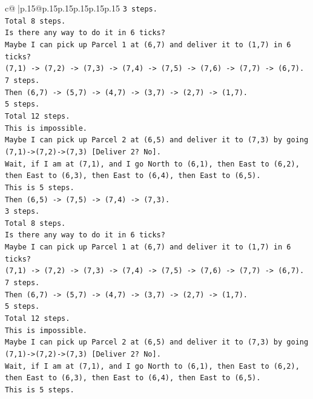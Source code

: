 \documentclass{article}
\begin{document}
{\begin{supertabular}{c@{$\;$}|p{.15\linewidth}@{}p{.15\linewidth}p{.15\linewidth}p{.15\linewidth}p{.15\linewidth}p{.15\linewidth}}
{{{\texttt{3 steps.} \\
\texttt{Total 8 steps.} \\
\texttt{Is there any way to do it in 6 ticks?} \\
\texttt{Maybe I can pick up Parcel 1 at (6,7) and deliver it to (1,7) in 6 ticks?} \\
\texttt{(7,1) {-}> (7,2) {-}> (7,3) {-}> (7,4) {-}> (7,5) {-}> (7,6) {-}> (7,7) {-}> (6,7).} \\
\texttt{7 steps.} \\
\texttt{Then (6,7) {-}> (5,7) {-}> (4,7) {-}> (3,7) {-}> (2,7) {-}> (1,7).} \\
\texttt{5 steps.} \\
\texttt{Total 12 steps.} \\
\texttt{This is impossible.} \\
\texttt{Maybe I can pick up Parcel 2 at (6,5) and deliver it to (7,3) by going (7,1){-}>(7,2){-}>(7,3) {[}Deliver 2? No{]}.} \\
\texttt{Wait, if I am at (7,1), and I go North to (6,1), then East to (6,2), then East to (6,3), then East to (6,4), then East to (6,5).} \\
\texttt{This is 5 steps.} \\
\texttt{Then (6,5) {-}> (7,5) {-}> (7,4) {-}> (7,3).} \\
\texttt{3 steps.} \\
\texttt{Total 8 steps.} \\
\texttt{Is there any way to do it in 6 ticks?} \\
\texttt{Maybe I can pick up Parcel 1 at (6,7) and deliver it to (1,7) in 6 ticks?} \\
\texttt{(7,1) {-}> (7,2) {-}> (7,3) {-}> (7,4) {-}> (7,5) {-}> (7,6) {-}> (7,7) {-}> (6,7).} \\
\texttt{7 steps.} \\
\texttt{Then (6,7) {-}> (5,7) {-}> (4,7) {-}> (3,7) {-}> (2,7) {-}> (1,7).} \\
\texttt{5 steps.} \\
\texttt{Total 12 steps.} \\
\texttt{This is impossible.} \\
\texttt{Maybe I can pick up Parcel 2 at (6,5) and deliver it to (7,3) by going (7,1){-}>(7,2){-}>(7,3) {[}Deliver 2? No{]}.} \\
\texttt{Wait, if I am at (7,1), and I go North to (6,1), then East to (6,2), then East to (6,3), then East to (6,4), then East to (6,5).} \\
\texttt{This is 5 steps.} \\
}}}
\end{supertabular}}
\end{document}
